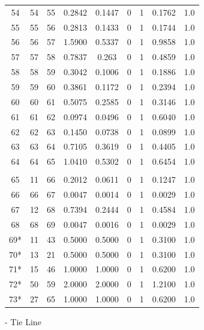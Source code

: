 \begin{longtable}{ccccccccc}
	54 & 54 & 55 & 0.2842 & 0.1447 & 0 & 1 & 0.1762 & 1.0 \\
	55 & 55 & 56 & 0.2813 & 0.1433 & 0 & 1 & 0.1744 & 1.0 \\
	56 & 56 & 57 & 1.5900 & 0.5337 & 0 & 1 & 0.9858 & 1.0 \\
	57 & 57 & 58 & 0.7837 & 0.263 & 0 & 1 & 0.4859 & 1.0 \\
	58 & 58 & 59 & 0.3042 & 0.1006 & 0 & 1 & 0.1886 & 1.0 \\
	59 & 59 & 60 & 0.3861 & 0.1172 & 0 & 1 & 0.2394 & 1.0 \\
	60 & 60 & 61 & 0.5075 & 0.2585 & 0 & 1 & 0.3146 & 1.0 \\
	61 & 61 & 62 & 0.0974 & 0.0496 & 0 & 1 & 0.6040 & 1.0 \\
	62 & 62 & 63 & 0.1450 & 0.0738 & 0 & 1 & 0.0899 & 1.0 \\
	63 & 63 & 64 & 0.7105 & 0.3619 & 0 & 1 & 0.4405 & 1.0 \\
	64 & 64 & 65 & 1.0410 & 0.5302 & 0 & 1 & 0.6454 & 1.0 \\
		\toprule\\
	\hline
	65 & 11 & 66 & 0.2012 & 0.0611 & 0 & 1 & 0.1247 & 1.0 \\
	66 & 66 & 67 & 0.0047 & 0.0014 & 0 & 1 & 0.0029 & 1.0 \\
	67 & 12 & 68 & 0.7394 & 0.2444 & 0 & 1 & 0.4584 & 1.0 \\
	68 & 68 & 69 & 0.0047 & 0.0016 & 0 & 1 & 0.0029 & 1.0 \\
	69* & 11 & 43 & 0.5000 & 0.5000 & 0 & 1 & 0.3100 & 1.0 \\
	70* & 13 & 21 & 0.5000 & 0.5000 & 0 & 1 & 0.3100 & 1.0 \\
	71* & 15 & 46 & 1.0000 & 1.0000 & 0 & 1 & 0.6200 & 1.0 \\
	72* & 50 & 59 & 2.0000 & 2.0000 & 0 & 1 & 1.2100 & 1.0 \\
	73* & 27 & 65 & 1.0000& 1.0000 & 0 & 1 & 0.6200 & 1.0 \\
	\bottomrule
\end{longtable}
\newline *- Tie Line	
	

%